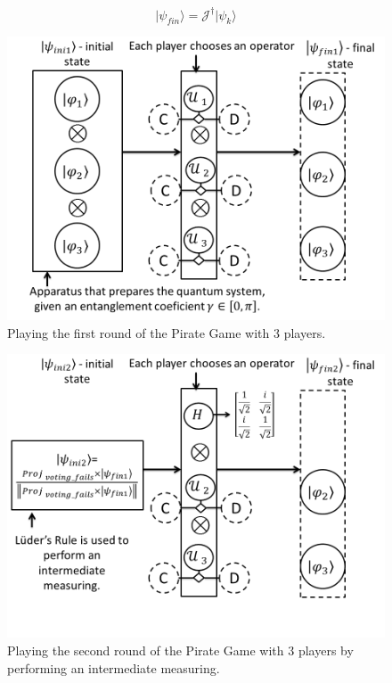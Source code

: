 \begin{equation}
\vert\psi_{fin}\rangle= \mathcal{J}^{\dagger}\vert\psi_{k}\rangle
\label{eq:piratas_final_move2}
\end{equation}

\begin{figure}[h]
\centering 
\includegraphics[scale=0.35]{Figures/architecture/esquema/Slide1.png}
\caption{Playing the first round of the Pirate Game with 3 players. }
\label{fig:pg_architecture3players}
\end{figure}

\begin{figure}[h]
\centering 
\includegraphics[scale=0.35]{Figures/architecture/esquema/Slide2.png}
\caption{Playing the second round of the Pirate Game with 3 players by performing an intermediate measuring. }
\label{fig:pg_architecture3players_2measure}
\end{figure}

